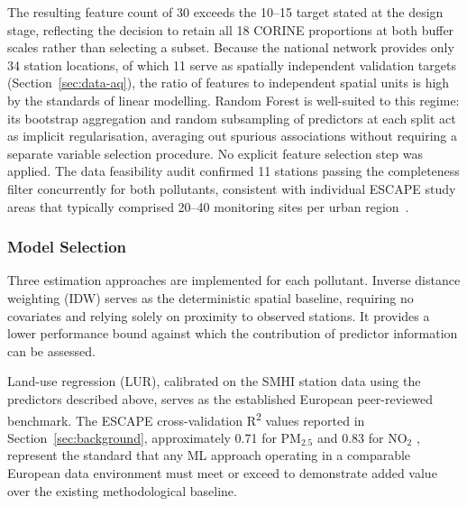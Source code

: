\documentclass[11pt,a4paper]{article}
\begin{document}
The resulting feature count of 30 exceeds the 10--15 target stated at the design stage, reflecting the decision to retain all 18 CORINE proportions at both buffer scales rather than selecting a subset. Because the national network provides only 34 station locations, of which 11 serve as spatially independent validation targets (Section~\ref{sec:data-aq}), the ratio of features to independent spatial units is high by the standards of linear modelling. Random Forest is well-suited to this regime: its bootstrap aggregation and random subsampling of predictors at each split act as implicit regularisation, averaging out spurious associations without requiring a separate variable selection procedure. No explicit feature selection step was applied. The data feasibility audit confirmed 11 stations passing the completeness filter concurrently for both pollutants, consistent with individual ESCAPE study areas that typically comprised 20--40 monitoring sites per urban region~\cite{eeftens_escape_pm_2012, wang_escape_no2_2013}.

\subsubsection{Model Selection}

Three estimation approaches are implemented for each pollutant. Inverse distance weighting (IDW) serves as the deterministic spatial baseline, requiring no covariates and relying solely on proximity to observed stations. It provides a lower performance bound against which the contribution of predictor information can be assessed.

Land-use regression (LUR), calibrated on the SMHI station data using the predictors described above, serves as the established European peer-reviewed benchmark. The ESCAPE cross-validation R\textsuperscript{2} values reported in Section~\ref{sec:background}, approximately 0.71 for PM$_{2.5}$ \cite{eeftens_escape_pm_2012} and 0.83 for NO$_2$ \cite{wang_escape_no2_2013}, represent the standard that any ML approach operating in a comparable European data environment must meet or exceed to demonstrate added value over the existing methodological baseline.
\end{document}
